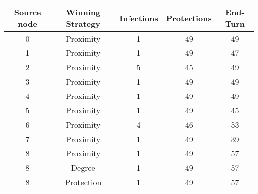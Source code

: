 \documentclass[results.tex]{subfiles}
\begin{document}
    \begin{center}
        \begin{tabular}{| c || c | c | c | c |}
            \hline
            {\bfseries Source node} & {\bfseries Winning Strategy} & {\bfseries Infections} & {\bfseries Protections}
            & {\bfseries End-Turn}
            \\  %
            \hline\hline
            0                       & Proximity                    & 1                      & 49                      & 49                   \\
            \hline
            1                       & Proximity                    & 1                      & 49                      & 47                   \\
            \hline
            2                       & Proximity                    & 5                      & 45                      & 49                   \\
            \hline
            3                       & Proximity                    & 1                      & 49                      & 49                   \\
            \hline
            4                       & Proximity                    & 1                      & 49                      & 49                   \\
            \hline
            5                       & Proximity                    & 1                      & 49                      & 45                   \\
            \hline
            6                       & Proximity                    & 4                      & 46                      & 53                   \\
            \hline
            7                       & Proximity                    & 1                      & 49                      & 39                   \\
            \hline
            8                       & Proximity                    & 1                      & 49                      & 57                   \\
            \hline
            8                       & Degree                       & 1                      & 49                      & 57                   \\
            \hline
            8                       & Protection                   & 1                      & 49                      & 57                   \\

\end{tabular}
\end{center}
\end{document}

